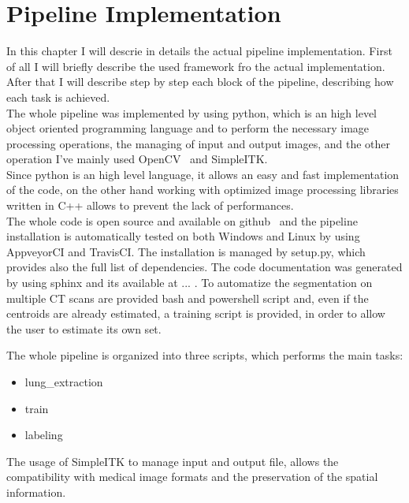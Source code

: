 
	
	\section{Pipeline Implementation}
	
	In this chapter I will descrie in details the actual pipeline implementation. First of all I will briefly describe the used framework fro the actual implementation. After that I will describe step by step each block of the pipeline, describing how each task is achieved.\\
	
	The whole pipeline was implemented by using python, which is an high level object oriented programming language and to perform the necessary image processing operations, the managing of input and output images, and the other operation I've mainly used OpenCV~\cite{OpenCV} and SimpleITK.\\
	Since python is an high level language, it allows an easy and fast implementation of the code, on the other hand working with optimized image processing libraries written in C++ allows to prevent the lack of performances.\\
		
	The whole code is open source and available on github~\cite{REP:CTLungSeg} and the pipeline installation is automatically tested on both Windows and Linux by using AppveyorCI and TravisCI.  The installation is managed by setup.py, which provides also the full list of dependencies. The code documentation was generated by using sphinx and its available at ... . To automatize the segmentation on multiple CT scans are provided bash and powershell script and,  even if the centroids are already estimated, a training script is provided, in order to allow the user to estimate its own set.
	
	The whole pipeline is organized into three scripts, which performs the main tasks: 
	\begin{itemize}
		\item lung\_extraction
		\item train
		\item labeling
	\end{itemize}

	The usage of SimpleITK to manage input and output file, allows the compatibility with medical image formats and the preservation of the spatial information.
 
